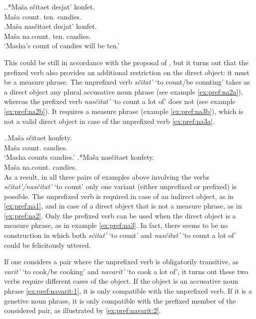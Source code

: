 \ex.\label{ex:pref:na2}\ag.*Ma\v{s}a s\v{c}itaet\textsuperscript{\IPF} desjat' konfet.\label{ex:pref:na2a}\\
Ma\v{s}a count. ten. candies.\\
\bg.\label{ex:pref:na2b}Ma\v{s}a nas\v{c}itaet\textsuperscript{\PF} desjat' konfet.\\
Ma\v{s}a na.count. ten. candies.\\
\trans `Masha's count of candies will be ten.'

This could be still in accordance with the proposal of \citet{Tatevosov:09}, but it turns out that the prefixed verb also provides an additional restriction on the direct object: it must be a measure phrase. The unprefixed verb \textit{s\v{c}itat'}\textsuperscript{\IPF} `to count/be counting' takes as a direct object any plural accusative noun phrase (see example \ref{ex:pref:na2a}), whereas the prefixed verb \textit{nas\v{c}itat'}\textsuperscript{\PF} `to count a lot of' does not (see example \ref{ex:pref:na2b}). It requires a measure phrase (example \ref{ex:pref:na3b}), which is not a valid direct object in case of the unprefixed verb \ref{ex:pref:na3a}. 

\ex.\label{ex:pref:na3}\ag.\label{ex:pref:na3a}Ma\v{s}a s\v{c}itaet\textsuperscript{\IPF} konfety.\\
Ma\v{s}a count. candies.\\
\trans `Masha counts candies.'
\bg.*Ma\v{s}a nas\v{c}itaet\textsuperscript{\PF} konfety.\label{ex:pref:na3b}\\
Ma\v{s}a na.count. candies.\\

As a result, in all three pairs of examples above involving the verbs \textit{s\v{c}itat'/nas\v{c}itat'} `to count' only one variant (either unprefixed or prefixed) is possible. The unprefixed verb is required in case of an indirect object, as in \ref{ex:pref:na1}, and in case of a direct object that is not a measure phrase, as in \ref{ex:pref:na2}. Only the prefixed verb can be used when the direct object is a measure phrase, as in example \ref{ex:pref:na3}. In fact, there seems to be no construction in which both \textit{s\v{c}itat'} `to count' and \textit{nas\v{c}itat'} `to count a lot of' could be felicitously uttered.

If one considers a pair where the unprefixed verb is obligatorily transitive, as \textit{varit'}\textsuperscript{\IPF} `to cook/be cooking' and \textit{navarit'}\textsuperscript{\PF} `to cook a lot of', it turns out these two verbs require different cases of the object. If the object is an accusative noun phrase \ref{ex:pref:navarit:1}, it is only compatible with the unprefixed verb. If it is a genetive noun phrase, it is only compatible with the prefixed member of the considered pair, as illustrated by \ref{ex:pref:navarit:2}.

